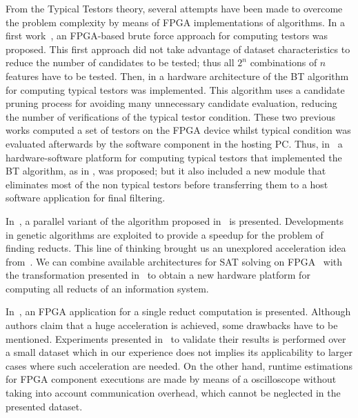 \documentclass[11pt]{article}   %
\begin{document}
  From the Typical Testors theory, several attempts have been made to overcome the problem 
  complexity by means of FPGA implementations of algorithms. In a first work~\cite{Cumplido06}, an 
  FPGA-based brute force approach for computing testors was proposed. This first approach did 
  not take advantage of dataset characteristics to reduce the number of candidates to be tested; 
  thus all $2^n$ combinations of $n$ features have to be tested. Then, in \cite{Rojas07} a hardware 
  architecture of the BT algorithm for computing typical testors was implemented. 
  This algorithm uses a candidate pruning process for avoiding many unnecessary candidate evaluation, 
  reducing the number of verifications of the typical testor condition. These two previous works computed 
  a set of testors on the FPGA device whilst typical condition was evaluated afterwards by the 
  software component in the hosting PC. Thus, in~\cite{Rojas12} a hardware-software platform for 
  computing typical testors that implemented the BT algorithm, as in \cite{Rojas07}, was proposed; but it also 
  included a new module that eliminates most of the non typical testors before transferring them to 
  a host software application for final filtering. 
	
  In~\cite{Wroblewski98}, a parallel variant of the algorithm proposed in~\cite{Wroblewski95} is presented.
  Developments in genetic algorithms are exploited to provide a speedup for the problem of finding reducts.
  This line of thinking brought us an unexplored acceleration idea from~\cite{Jensen14}. We can combine 
  available architectures for SAT solving on FPGA~\cite{Safar07,Kanazawa11} with the transformation
  presented in~\cite{Jensen14} to obtain a new hardware platform for computing all reducts of an information 
  system.
  
  In~\cite{Grzes13,Kopczynski14}, an FPGA application for a single reduct computation is presented. Although
  authors claim that a huge acceleration is achieved, some drawbacks have to be mentioned. Experiments presented 
  in~\cite{Kopczynski14} to validate their results is performed over a small dataset which in our experience 
  does not implies its applicability to larger cases where such acceleration are needed. On the other hand, 
  runtime estimations for FPGA component executions are made by means of a oscilloscope without taking into 
  account communication overhead, which cannot be neglected in the presented dataset.
\end{document}
